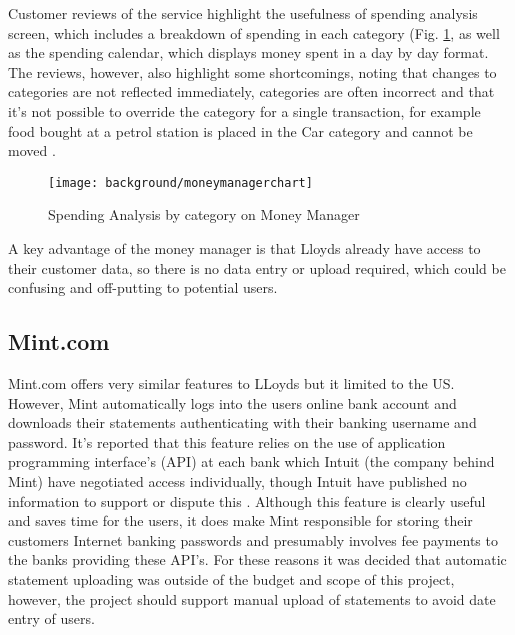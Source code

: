 Customer reviews of the service highlight the usefulness of spending analysis screen, which includes a breakdown of spending in each \gls{category} (Fig. \ref{fig:moneymanager}, as well as the spending calendar, which displays money spent in a day by day format.
%
The reviews, however, also highlight some shortcomings, noting that changes to categories are not reflected immediately, categories are often incorrect and that it's not possible to override the \gls{category} for a single transaction, for example food bought at a petrol station is placed in the Car \gls{category} and cannot be moved \cite{moneywatch2011lloyds, moneysupermarket2011lloyds}.

\begin{figure}[h]
    \centering
    \texttt{[image: background/moneymanagerchart]}
    \caption{Spending Analysis by category on Money Manager \parencite{lloyds2014money}}
    \label{fig:moneymanager}
\end{figure}

A key advantage of the money manager is that Lloyds already have access to their customer data, so there is no data entry or upload required, which could be confusing and off-putting to potential users.

\subsection{Mint.com}
Mint.com offers very similar features to LLoyds but it limited to the US. However, Mint automatically logs into the users online bank account and downloads their statements authenticating with their banking username and password. It's reported that this feature relies on the use of application programming interface's (API) at each bank which Intuit (the company behind Mint) have negotiated access individually, though Intuit have published no information to support or dispute this \cite{stackoverflow2012bankingapi, stackoverflow2012bankingapi2}.
% 
Although this feature is clearly useful and saves time for the users, it does make Mint responsible for storing their customers Internet banking passwords and presumably involves fee payments to the banks providing these API's. 
%
For these reasons it was decided that automatic statement uploading was outside of the budget and scope of this project, however, the project should support manual upload of statements to avoid date entry of users. 


